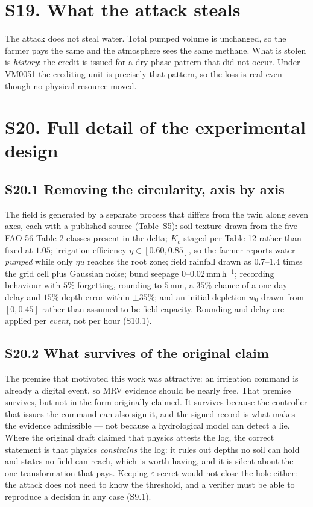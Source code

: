 \section*{S19. What the attack steals}

The attack does not steal water. Total pumped volume is unchanged, so the
farmer pays the same and the atmosphere sees the same methane. What is stolen
is \emph{history}: the credit is issued for a dry-phase pattern that did not
occur. Under VM0051 the crediting unit is precisely that pattern, so the loss
is real even though no physical resource moved.

\section*{S20. Full detail of the experimental design}

\subsection*{S20.1 Removing the circularity, axis by axis}

The field is generated by a separate process that differs from the twin along
seven axes, each with a published source (Table~S5): soil texture drawn from
the five FAO-56 Table 2 classes present in the delta; $K_c$ staged per Table 12
rather than fixed at $1.05$; irrigation efficiency $\eta\in[0.60,0.85]$, so
the farmer reports water \emph{pumped} while only $\eta u$ reaches the root
zone; field rainfall drawn as $0.7$--$1.4$ times the grid cell plus Gaussian
noise; bund seepage $0$--$0.02$\,mm\,h$^{-1}$; recording behaviour with $5\%$
forgetting, rounding to $5$\,mm, a $35\%$ chance of a one-day delay and
$15\%$ depth error within $\pm35\%$; and an initial depletion $w_0$ drawn
from $[0,0.45]$ rather than assumed to be field capacity. Rounding and delay
are applied per \emph{event}, not per hour (S10.1).

\subsection*{S20.2 What survives of the original claim}

The premise that motivated this work was attractive: an irrigation command is
already a digital event, so MRV evidence should be nearly free. That premise
survives, but not in the form originally claimed. It survives because the controller that issues the command can also sign it, and the signed record is
what makes the evidence admissible --- not because a hydrological model can
detect a lie. Where the original draft claimed that physics attests the log,
the correct statement is that physics \emph{constrains} the log: it rules out
depths no soil can hold and states no field can reach, which is worth having,
and it is silent about the one transformation that pays. Keeping $\varepsilon$
secret would not close the hole either: the attack does not need to know the
threshold, and a verifier must be able to reproduce a decision in any case
(S9.1).

